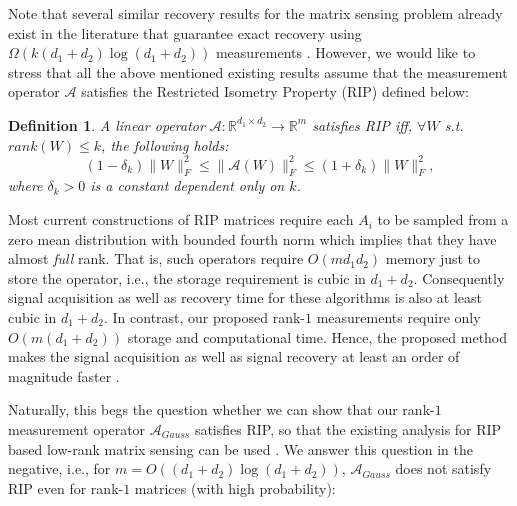 \documentclass[11pt]{article}
\newtheorem{defn}[lemma]{Definition}
\newcommand{\calA}{\mathcal{A}}
\begin{document}
Note that %
several similar recovery results for the matrix sensing problem already exist in the literature that guarantee exact recovery using $\Omega(k (d_1+d_2)\log(d_1+d_2))$ measurements \cite{RechtFP2007,LeeBre09,JainMD10}. However, we would like to  stress that all the above mentioned existing results assume that the measurement operator $\calA$ satisfies the Restricted Isometry Property (RIP) defined below: 
  \begin{defn}
    \label{defn:rip}
A linear operator $\calA: \mathbb{R}^{d_1\times d_2}\rightarrow \mathbb{R}^{m}$ satisfies RIP iff, $\forall W$ s.t. $rank(W)\leq k$, the following holds: 
$$(1-\delta_k)\|W\|_F^2\leq \|\calA(W)\|_F^2 \leq (1+\delta_k) \|W\|_F^2,$$
where $\delta_k>0$ is a constant dependent only on $k$. 
  \end{defn}
Most current constructions of RIP matrices require each $A_i$ to be sampled from a zero mean distribution with bounded fourth norm which implies that they have almost {\em full} rank. That is, such operators require $O(m d_1 d_2)$ memory just to store the operator, i.e., the storage requirement is cubic in $d_1+d_2$. Consequently signal acquisition as well as recovery time for these algorithms is also at least cubic in $d_1+d_2$. In contrast, our proposed rank-$1$ measurements require only $O(m (d_1+d_2))$ storage and computational time. Hence, the proposed method makes the signal acquisition as well as signal recovery at least an order of magnitude faster . 

Naturally, this begs the question whether we can show that our rank-$1$ measurement operator $\calA_{Gauss}$ satisfies RIP, so that the existing analysis for RIP based low-rank matrix sensing can be used \cite{JainNS13}. We answer this question in the negative, i.e., for $m=O((d_1+d_2)\log(d_1+d_2))$, $\calA_{Gauss}$ does not satisfy RIP even for rank-$1$ matrices (with high probability): %
\end{document}
